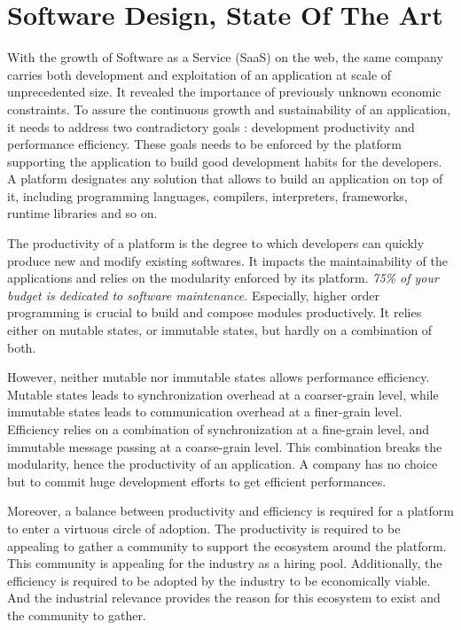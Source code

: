 \chapter{Software Design, State Of The Art} \label{chapter3}
\minitoc
\eject


With the growth of Software as a Service (SaaS) on the web, the same company carries both development and exploitation of an application at scale of unprecedented size.
It revealed the importance of previously unknown economic constraints.
To assure the continuous growth and sustainability of an application, it needs to address two contradictory goals : development productivity and performance efficiency.
These goals needs to be enforced by the platform supporting the application to build good development habits for the developers.
A platform designates any solution that allows to build an application on top of it, including programming languages, compilers, interpreters, frameworks, runtime libraries and so on.

The productivity of a platform is the degree to which developers can quickly produce new and modify existing softwares.
It impacts the maintainability of the applications and relies on the modularity enforced by its platform.
\textit{75\% of your budget is dedicated to software maintenance.}
Especially, higher order programming is crucial to build and compose modules productively.
It relies either on mutable states, or immutable states, but hardly on a combination of both.

However, neither mutable nor immutable states allows performance efficiency.
Mutable states leads to synchronization overhead at a coarser-grain level, while immutable states leads to communication overhead at a finer-grain level.
Efficiency relies on a combination of synchronization at a fine-grain level, and immutable message passing at a coarse-grain level.
This combination breaks the modularity, hence the productivity of an application.
A company has no choice but to commit huge development efforts to get efficient performances.

Moreover, a balance between productivity and efficiency is required for a platform to enter a virtuous circle of adoption.
The productivity is required to be appealing to gather a community to support the ecosystem around the platform.
This community is appealing for the industry as a hiring pool.
Additionally, the efficiency is required to be adopted by the industry to be economically viable.
And the industrial relevance provides the reason for this ecosystem to exist and the community to gather.

